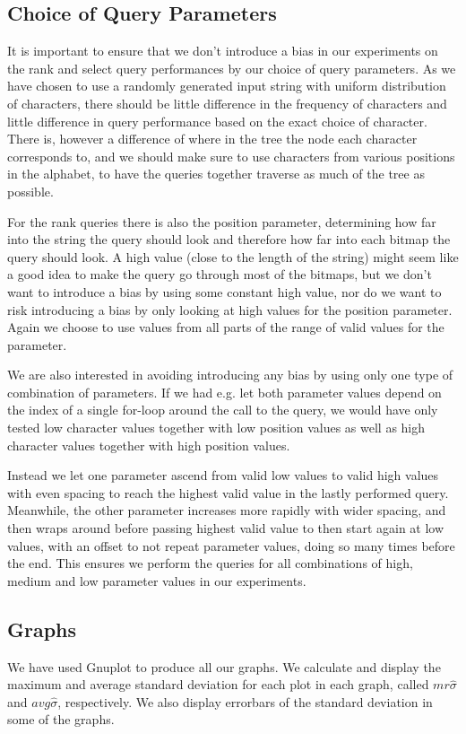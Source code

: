 \subsection{Choice of Query Parameters}
It is important to ensure that we don't introduce a bias in our experiments on the rank and select query performances by our choice of query parameters.
As we have chosen to use a randomly generated input string with uniform distribution of characters, there should be little difference in the frequency of characters and little difference in query performance based on the exact choice of character.
There is, however a difference of where in the tree the node each character corresponds to, and we should make sure to use characters from various positions in the alphabet, to have the queries together traverse as much of the tree as possible.

For the rank queries there is also the position parameter, determining how far into the string the query should look and therefore how far into each bitmap the query should look.
A high value (close to the length of the string) might seem like a good idea to make the query go through most of the bitmaps, but we don't want to introduce a bias by using some constant high value, nor do we want to risk introducing a bias by only looking at high values for the position parameter.
Again we choose to use values from all parts of the range of valid values for the parameter.

We are also interested in avoiding introducing any bias by using only one type of combination of parameters.
If we had e.g. let both parameter values depend on the index of a single for-loop around the call to the query, we would have only tested low character values together with low position values as well as high character values together with high position values.

Instead we let one parameter ascend from valid low values to valid high values with even spacing to reach the highest valid value in the lastly performed query. Meanwhile, the other parameter increases more rapidly with wider spacing, and then wraps around before passing highest valid value to then start again at low values, with an offset to not repeat parameter values, doing so many times before the end.
This ensures we perform the queries for all combinations of high, medium and low parameter values in our experiments.

\subsection{Graphs}
We have used Gnuplot to produce all our graphs.
We calculate and display the maximum and average standard deviation for each plot in each graph, called $mr\hat{\sigma}$ and $avg\hat{\sigma}$, respectively.
We also display errorbars of the standard deviation in some of the graphs.
